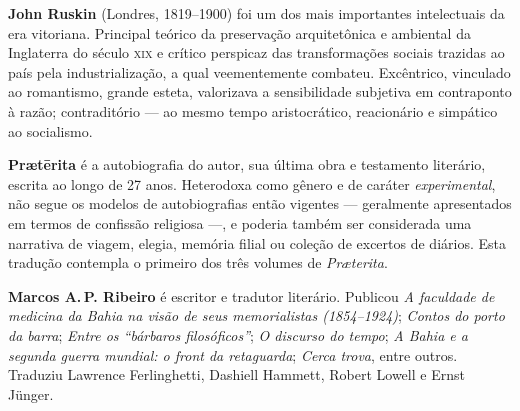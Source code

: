 \textbf{John Ruskin} (Londres, 1819--1900) foi um dos mais importantes intelectuais da era vitoriana. Principal teórico da preservação arquitetônica e ambiental da Inglaterra do século \textsc{xix} e crítico perspicaz das transformações sociais trazidas ao país pela industrialização, a qual veementemente combateu. Excêntrico, vinculado ao romantismo, grande esteta, valorizava a sensibilidade subjetiva em contraponto à razão; contraditório --- ao mesmo tempo aristocrático, reacionário e simpático ao socialismo.

\textbf{Pr\ae tērita} é a autobiografia do autor, sua última obra e testamento literário, escrita ao longo de 27 anos. Heterodoxa como gênero e de caráter \textit{experimental}, não segue os modelos de autobiografias então vigentes --- geralmente apresentados em termos de confissão religiosa ---, e poderia também ser considerada uma narrativa de viagem, elegia, memória filial ou coleção de excertos de diários. Esta tradução contempla o primeiro dos três volumes de \textit{Pr\ae terita}.

\textbf{Marcos A.\,P. Ribeiro} é escritor e tradutor literário. Publicou \textit{A faculdade de medicina da Bahia na visão de seus memorialistas (1854--1924)}; \textit{Contos do porto da barra}; \textit{Entre os “bárbaros filosóficos”}; \textit{O discurso do tempo}; \textit{A Bahia e a segunda guerra mundial: o front da retaguarda}; \textit{Cerca trova}, entre outros. Traduziu Lawrence Ferlinghetti, Dashiell Hammett, Robert Lowell e Ernst Jünger. 






